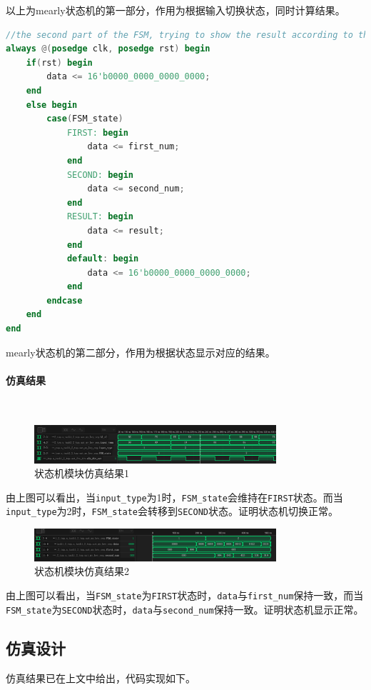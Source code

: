 \documentclass[UTF8]{ctexart}
\newcommand{\subsubsubsection}[1]{\paragraph{#1}\mbox{}\\}
\begin{document}
以上为mearly状态机的第一部分，作用为根据输入切换状态，同时计算结果。
\begin{framed}
    \begin{lstlisting}[language=verilog,style=verilogStyle]
//the second part of the FSM, trying to show the result according to the state
always @(posedge clk, posedge rst) begin
	if(rst) begin
		data <= 16'b0000_0000_0000_0000;
	end
	else begin
		case(FSM_state)
			FIRST: begin
				data <= first_num;
			end
			SECOND: begin
				data <= second_num;
			end
			RESULT: begin
				data <= result;
			end
			default: begin
				data <= 16'b0000_0000_0000_0000;
			end
		endcase
	end
end
    \end{lstlisting}
\end{framed}
mearly状态机的第二部分，作用为根据状态显示对应的结果。
\subsubsubsection{仿真结果}
\begin{figure}[H]
    \centering
    \includegraphics[width=0.8\textwidth]{task1_3_4.png}
    \caption{状态机模块仿真结果1}
\end{figure}
由上图可以看出，当\texttt{input\_type}为1时，\texttt{FSM\_state}会维持在\texttt{FIRST}状态。而当\texttt{input\_type}为2时，\texttt{FSM\_state}会转移到\texttt{SECOND}状态。证明状态机切换正常。
\begin{figure}[H]
    \centering
    \includegraphics[width=0.8\textwidth]{task1_3_5.png}
    \caption{状态机模块仿真结果2}
\end{figure}
由上图可以看出，当\texttt{FSM\_state}为\texttt{FIRST}状态时，\texttt{data}与\texttt{first\_num}保持一致，而当\texttt{FSM\_state}为\texttt{SECOND}状态时，\texttt{data}与\texttt{second\_num}保持一致。证明状态机显示正常。
\subsection{仿真设计}
仿真结果已在上文中给出，代码实现如下。
\end{document}
